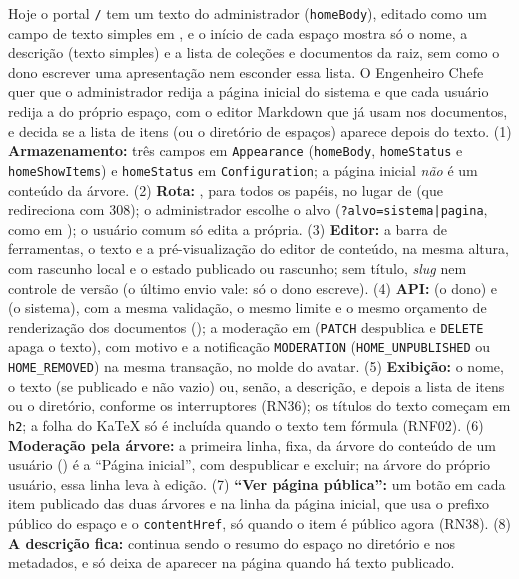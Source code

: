 {Hoje o portal \texttt{/} tem um texto do administrador (\texttt{homeBody}), editado como um campo de texto simples em , e o início de cada espaço mostra só o nome, a descrição (texto simples) e a lista de coleções e documentos da raiz, sem como o dono escrever uma apresentação nem esconder essa lista. O Engenheiro Chefe quer que o administrador redija a página inicial do sistema e que cada usuário redija a do próprio espaço, com o editor Markdown que já usam nos documentos, e decida se a lista de itens (ou o diretório de espaços) aparece depois do texto.}
{(1) \textbf{Armazenamento:} três campos em \texttt{Appearance} (\texttt{homeBody}, \texttt{homeStatus} e \texttt{homeShowItems}) e \texttt{homeStatus} em \texttt{Configuration}; a página inicial \emph{não} é um conteúdo da árvore. (2) \textbf{Rota:} , para todos os papéis, no lugar de  (que redireciona com 308); o administrador escolhe o alvo (\texttt{?alvo=sistema|pagina}, como em ); o usuário comum só edita a própria. (3) \textbf{Editor:} a barra de ferramentas, o texto e a pré-visualização do editor de conteúdo, na mesma altura, com rascunho local e o estado publicado ou rascunho; sem título, \emph{slug} nem controle de versão (o último envio vale: só o dono escreve). (4) \textbf{API:}  (o dono) e  (o sistema), com a mesma validação, o mesmo limite e o mesmo orçamento de renderização dos documentos (); a moderação em  (\texttt{PATCH} despublica e \texttt{DELETE} apaga o texto), com motivo e a notificação \texttt{MODERATION} (\texttt{HOME\_UNPUBLISHED} ou \texttt{HOME\_REMOVED}) na mesma transação, no molde do avatar. (5) \textbf{Exibição:} o nome, o texto (se publicado e não vazio) ou, senão, a descrição, e depois a lista de itens ou o diretório, conforme os interruptores (RN36); os títulos do texto começam em \texttt{h2}; a folha do KaTeX só é incluída quando o texto tem fórmula (RNF02). (6) \textbf{Moderação pela árvore:} a primeira linha, fixa, da árvore do conteúdo de um usuário () é a ``Página inicial'', com despublicar e excluir; na árvore do próprio usuário, essa linha leva à edição. (7) \textbf{``Ver página pública'':} um botão em cada item publicado das duas árvores e na linha da página inicial, que usa o prefixo público do espaço e o \texttt{contentHref}, só quando o item é público agora (RN38). (8) \textbf{A descrição fica:} continua sendo o resumo do espaço no diretório e nos metadados, e só deixa de aparecer na página quando há texto publicado.}
